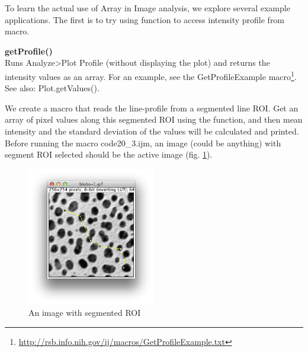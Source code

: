 To learn the actual use of Array in Image analysis, we explore several example applications. The first is to try using  function to access intensity profile from macro. 

\begin{shaded}\begin{indentCom}
\textbf{getProfile()}\\
Runs Analyze>Plot Profile (without displaying the plot) and returns the intensity values as an array. For an example, see the GetProfileExample macro\footnote{\url{http://rsb.info.nih.gov/ij/macros/GetProfileExample.txt}}. See also: Plot.getValues().
\end{indentCom}\end{shaded}
 
We create a macro that reads the line-profile from a segmented line ROI. Get an array of pixel values along this segmented ROI using the  function, and then mean intensity and the standard deviation of the values will be calculated and printed. 
Before running the macro code20\_3.ijm, an image (could be anything) with segment ROI selected should be the active image (fig. \ref{fig:segmentedROIselected}). 




\begin{figure}[h!]
\begin{center}
\includegraphics[width=0.5\textwidth]{fig/segmentROIselected.png}
\caption{An image with segmented ROI}
\label{fig:segmentedROIselected}
\end{center}
\end{figure}

